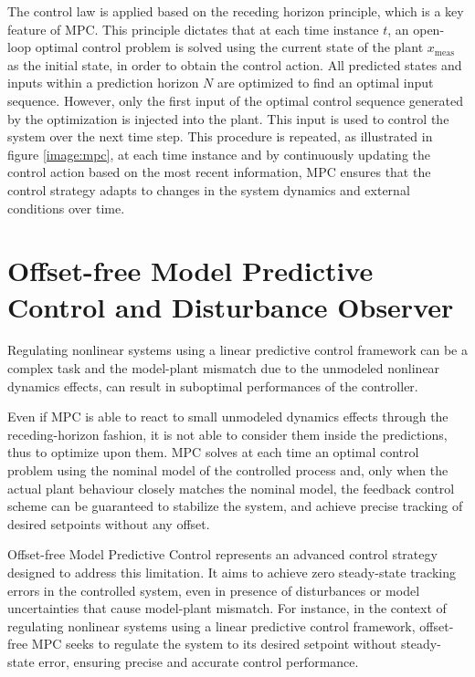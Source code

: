 \documentclass[a4paper,12pt,oneside]{book}
\begin{document}
\bigskip
The control law is applied based on the receding horizon principle, which is a key feature of MPC.
This principle dictates that at each time instance $t$, an open-loop optimal control problem is solved using the current state of the plant $x_{\text{meas}}$ as the initial state, in order to obtain the control action. 
All predicted states and inputs within a prediction horizon $N$ are optimized to find an optimal input sequence.
However, only the first input of the optimal control sequence generated by the optimization is injected into the plant. 
This input is used to control the system over the next time step.
This procedure is repeated, as illustrated in figure \ref{image:mpc}, at each time instance and by continuously updating the control action based on the most recent information, MPC ensures that the control strategy adapts to changes in the system dynamics and external conditions over time.




\section{Offset-free Model Predictive Control and Disturbance Observer}
Regulating nonlinear systems using a linear predictive control framework can be a complex task and the model-plant mismatch due to the unmodeled nonlinear dynamics effects, can result in suboptimal performances of the controller.

\bigskip
Even if MPC is able to react to small unmodeled dynamics effects through the receding-horizon fashion, it is not able to consider them inside the predictions, thus to optimize upon them.
MPC solves at each time an optimal control problem using the nominal model of the controlled process and, only when the actual plant behaviour closely matches the nominal model, the feedback control scheme can be guaranteed to stabilize the system, and achieve precise tracking of desired setpoints without any offset.

\bigskip
Offset-free Model Predictive Control represents an advanced control strategy designed to address this limitation. It aims to achieve zero steady-state tracking errors in the controlled system, even in presence of disturbances or model uncertainties that cause model-plant mismatch.
For instance, in the context of regulating nonlinear systems using a linear predictive control framework, offset-free MPC seeks to regulate the system to its desired setpoint without steady-state error, ensuring precise and accurate control performance.
\end{document}
